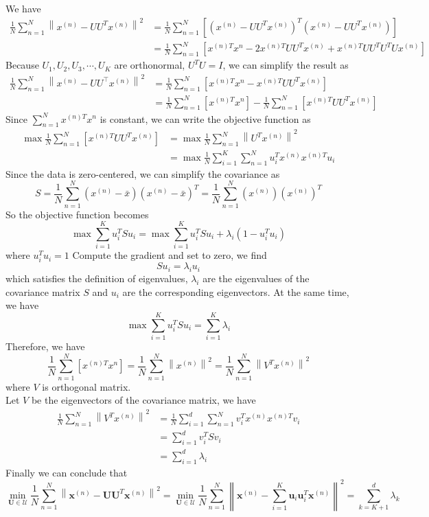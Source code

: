 \documentclass{article}
\begin{document}
We have 
$$
\begin{aligned}
\frac{1}{N} \sum_{n=1}^{N}\left\|x^{(n)}-U U^{T} x^{(n)}\right\|^{2} &=\frac{1}{N} \sum_{n=1}^{N}\left[\left(x^{(n)}-U U^{T} x^{(n)}\right)^{T}\left(x^{(n)}-U U^{T} x^{(n)}\right)\right] \\
&=\frac{1}{N} \sum_{n=1}^{N}\left[x^{(n) T} x^{n}-2 x^{(n) T} U U^{T} x^{(n)}+x^{(n) T} U U^{T} U^{T} U x^{(n)}\right]
\end{aligned}
$$
Because ${U_1, U_2, U_3, \cdots, U_K}$ are orthonormal, $U^TU = I$, we can simplify the result as
$$
\begin{aligned}
\frac{1}{N} \sum_{n=1}^{N}\left\|x^{(n)}-U U^{\top} x^{(n)}\right\|^{2} &=\frac{1}{N} \sum_{n=1}^{N}\left[x^{(n) T} x^{n}-x^{(n) T} U U^{T} x^{(n)}\right] \\
&=\frac{1}{N} \sum_{n=1}^{N}\left[x^{(n) T} x^{n}\right]-\frac{1}{N} \sum_{n=1}^{N}\left[x^{(n) T} U U^{T} x^{(n)}\right]
\end{aligned}
$$
Since $\sum_{n=1}^{N} x^{(n) T}x^n$ is constant, we can write the objective function as 
$$
\begin{aligned}
\max \frac{1}{N} \sum_{n=1}^{N}\left[x^{(n) T} U U^{T} x^{(n)}\right] &=\max \frac{1}{N} \sum_{n=1}^{N}\left\|U^{T} x^{(n)}\right\|^{2} \\ 
&=\max \frac{1}{N} \sum_{i=1}^{K} \sum_{n=1}^{N} u_{i}^{T} x^{(n)} x^{(n) T} u_{i}
\end{aligned}
$$
Since the data is zero-centered, we can simplify the covariance as
$$
S=\frac{1}{N} \sum_{n=1}^{N}\left(x^{(n)}-\bar{x}\right)\left(x^{(n)}-\bar{x}\right)^{T}=\frac{1}{N} \sum_{n=1}^{N}\left(x^{(n)}\right)\left(x^{(n)}\right)^{T}
$$
So the objective function becomes
$$
\max \sum_{i=1}^{K}u_i^TSu_i = \max \sum_{i=1}^{K}u_i^TSu_i + \lambda_i(1-u_i^Tu_i)
$$
where $u_i^Tu_i=1$
Compute the gradient and set to zero, we find
$$
Su_i = \lambda_iu_i
$$
which satisfies the definition of eigenvalues, $\lambda_i$ are the eigenvalues of the covariance matrix $S$ and $u_i$ are the corresponding eigenvectors. At the same time, we have 
$$
\max \sum_{i=1}^{K}u_i^TSu_i = \sum_{i=1}^K \lambda_i
$$
Therefore, we have
$$
\frac{1}{N} \sum_{n=1}^{N}\left[x^{(n) T} x^{n}\right]=\frac{1}{N} \sum_{n=1}^{N}\left\|x^{(n)}\right\|^{2}=\frac{1}{N} \sum_{n=1}^{N}\left\|V^{T} x^{(n)}\right\|^{2}
$$
where $V$ is orthogonal matrix. \\
Let $V$ be the eigenvectors of the covariance matrix, we have
$$
\begin{aligned}
\frac{1}{N} \sum_{n=1}^{N}\left\|V^{T} x^{(n)}\right\|^{2}&=\frac{1}{N} \sum_{i=1}^{d} \sum_{n=1}^{N} v_{i}^{T} x^{(n)} x^{(n) T} v_{i} \\ &=\sum_{i=1}^{d} v_{i}^{T} S v_{i} \\ &=\sum_{i=1}^{d} \lambda_{i}
\end{aligned}
$$
Finally we can conclude that
$$
\min _{\mathbf{U} \in \mathcal{U}} \frac{1}{N} \sum_{n=1}^{N}\left\|\mathbf{x}^{(n)}-\mathbf{U U}^{T} \mathbf{x}^{(n)}\right\|^{2}=\min _{\mathbf{U} \in \mathcal{U}} \frac{1}{N} \sum_{n=1}^{N}\left\|\mathbf{x}^{(n)}-\sum_{i=1}^{K} \mathbf{u}_{i} \mathbf{u}_{i}^{T} \mathbf{x}^{(n)}\right\|^{2}=\sum_{k=K+1}^{d} \lambda_{k}
$$
\end{document}
